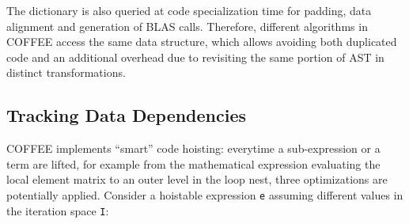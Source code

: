 The dictionary is also queried at code specialization time for padding, data alignment and generation of BLAS calls. Therefore, different algorithms in COFFEE access the same data structure, which allows avoiding both duplicated code and an additional overhead due to revisiting the same portion of AST in distinct transformations.

\subsection{Tracking Data Dependencies}
COFFEE implements ``smart'' code hoisting: everytime a sub-expression or a term are lifted, for example from the mathematical expression evaluating the local element matrix to an outer level in the loop nest, three optimizations are potentially applied. Consider a hoistable expression \texttt{e} assuming different values in the iteration space \texttt{I}:
